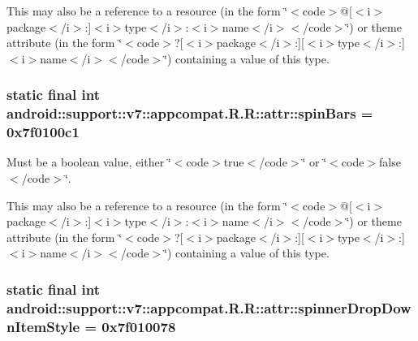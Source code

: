 This may also be a reference to a resource (in the form \char`\"{}$<$code$>$@\mbox{[}$<$i$>$package$<$/i$>$:\mbox{]}$<$i$>$type$<$/i$>$:$<$i$>$name$<$/i$>$$<$/code$>$\char`\"{}) or theme attribute (in the form \char`\"{}$<$code$>$?\mbox{[}$<$i$>$package$<$/i$>$:\mbox{]}\mbox{[}$<$i$>$type$<$/i$>$:\mbox{]}$<$i$>$name$<$/i$>$$<$/code$>$\char`\"{}) containing a value of this type. \hypertarget{classandroid_1_1support_1_1v7_1_1appcompat_1_1_r_1_1attr_c2d4f3e530c2763939d12a7c0c36fe35}{
\subsubsection[{spinBars}]{\setlength{\rightskip}{0pt plus 5cm}static final int android::support::v7::appcompat.R.R::attr::spinBars = 0x7f0100c1}}
\label{classandroid_1_1support_1_1v7_1_1appcompat_1_1_r_1_1attr_c2d4f3e530c2763939d12a7c0c36fe35}


Must be a boolean value, either \char`\"{}$<$code$>$true$<$/code$>$\char`\"{} or \char`\"{}$<$code$>$false$<$/code$>$\char`\"{}. 

This may also be a reference to a resource (in the form \char`\"{}$<$code$>$@\mbox{[}$<$i$>$package$<$/i$>$:\mbox{]}$<$i$>$type$<$/i$>$:$<$i$>$name$<$/i$>$$<$/code$>$\char`\"{}) or theme attribute (in the form \char`\"{}$<$code$>$?\mbox{[}$<$i$>$package$<$/i$>$:\mbox{]}\mbox{[}$<$i$>$type$<$/i$>$:\mbox{]}$<$i$>$name$<$/i$>$$<$/code$>$\char`\"{}) containing a value of this type. \hypertarget{classandroid_1_1support_1_1v7_1_1appcompat_1_1_r_1_1attr_73f37c28bff20cd3d7f6912ce74742ff}{
\subsubsection[{spinnerDropDownItemStyle}]{\setlength{\rightskip}{0pt plus 5cm}static final int android::support::v7::appcompat.R.R::attr::spinnerDropDownItemStyle = 0x7f010078}}
\label{classandroid_1_1support_1_1v7_1_1appcompat_1_1_r_1_1attr_73f37c28bff20cd3d7f6912ce74742ff}


